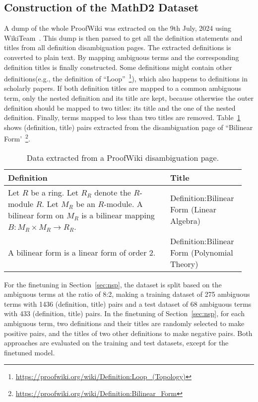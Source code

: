 \subsection{Construction of the MathD2 Dataset}
A dump of the whole ProofWiki was extracted on the 9th July, 2024 using WikiTeam~\cite{wikiteamwikiteam_2024}.
This dump is then parsed to get all the definition statements and titles from all definition disambiguation pages. The extracted definitions is converted to plain text.  By mapping ambiguous terms and the corresponding definition titles is finally constructed.
Some definitions might contain other definitions(e.g., the definition of ``Loop''~\footnote{\url{https://proofwiki.org/wiki/Definition:Loop_(Topology)}}), which also happens to definitions in scholarly papers. If both definition titles are mapped to a common ambiguous term, only the nested definition and its title are kept, because otherwise the outer definition should be mapped to two titles: its title and the one of the nested definition. %
Finally, terms mapped to less than two titles are removed. 
Table~\ref{tab:proofwikidata} shows (definition, title) pairs extracted from the disambiguation page of ``Bilinear Form'~\footnote{\url{https://proofwiki.org/wiki/Definition:Bilinear_Form}}.
\squeezeup
\begin{table}
    \centering
    \caption{Data extracted from a ProofWiki disambiguation page.}
    \begin{tabular}{|p{0.65\linewidth}|p{0.3\linewidth}|}
          \hline
           Definition&Title\\\hline
            Let $R$ be a ring. Let $R_R$ denote the $R$-module $R$. Let $M_R$ be an $R$-module. A bilinear form on $M_R$ is a bilinear mapping $B : M_R \times M_R \to R_R$.&Definition:Bilinear Form (Linear Algebra) \\\hline
            A bilinear form is a linear form of order $2$.&Definition:Bilinear Form (Polynomial Theory)\\\hline
    \end{tabular}
    \label{tab:proofwikidata}
\end{table}
For the finetuning in Section~\ref{sec:nsp}, %
the dataset is split based on the ambiguous terms at the ratio of 8:2, making a training dataset of 275 ambiguous terms with 1436 (definition, title) pairs and a test dataset of 68 ambiguous terms with 433 (definition, title) pairs.  In the finetuning %
of Section~\ref{sec:nsp}, for each ambiguous term, %
two definitions and their titles are randomly selected to make positive pairs, and the titles of two other definitions to make negative pairs. %
Both approaches are evaluated on the training and test datasets, except for the finetuned model. 
